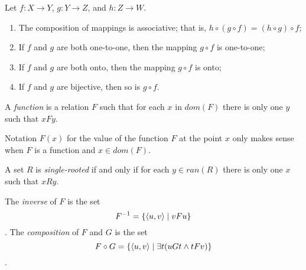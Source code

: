 \documentclass[letterpaper, 10pt]{article}
\begin{document}
	\begin{thm}
		Let $f\colon X\to Y$, $g\colon Y\to Z$, and $h\colon Z\to W$.
		\begin{enumerate}
			\item The composition of mappings is associative; that is,
				$h\circ(g\circ f) = (h\circ g)\circ f$;
			\item If $f$ and $g$ are both one-to-one, then the mapping $g \circ
				f$ is one-to-one;
			\item If $f$ and $g$ are both onto, then the mapping $g \circ f$ is
				onto;
			\item If $f$ and $g$ are bijective, then so is $g \circ f$.
		\end{enumerate}
	\end{thm}

	A \emph{function} is a relation $F$ such that for each $x$ in $dom(F)$ there is
	only one $y$ such that $xFy$.

	Notation $F(x)$ for the value of the function $F$ at the point $x$ only
	makes sense when $F$ is a function and $x\in dom(F)$.

	A set $R$ is \emph{single-rooted} if and only if for each $y \in ran(R)$
	there is only one $x$ such that $xRy$.

	The \emph{inverse} of $F$ is the set
	\[
		F^{-1} = \left\{\left< u,v \right> \mid vFu\right\}
	\].
	The \emph{composition} of $F$ and $G$ is the set
	\[
		F \circ G = \left\{\left< u,v \right> \mid \exists t (uGt \land tFv)\right\}
	\].
\end{document}
